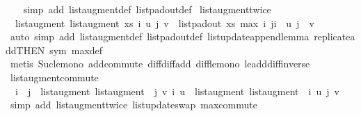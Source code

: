 \begin{isabellebody}
%
\isadelimproof
\ \ %
\endisadelimproof
%
\isatagproof
{}\isamarkupfalse%
\ {\isacharparenleft}simp\ add{\isacharcolon}\ list{\isacharunderscore}augment{\isacharunderscore}def\ list{\isacharunderscore}pad{\isacharunderscore}out{\isacharunderscore}def{\isacharparenright}%
\endisatagproof
{\isafoldproof}%
%
\isadelimproof
\isanewline
%
\endisadelimproof
\isanewline
{}\isamarkupfalse%
\ list{\isacharunderscore}augment{\isacharunderscore}twice{\isacharcolon}\isanewline
\ \ {\isachardoublequoteopen}list{\isacharunderscore}augment\ {\isacharparenleft}list{\isacharunderscore}augment\ xs\ i\ u{\isacharparenright}\ j\ v\ {\isacharequal}\ list{\isacharunderscore}pad{\isacharunderscore}out\ xs\ {\isacharparenleft}max\ i\ j{\isacharparenright}{\isacharbrackleft}i\ {\isacharcolon}{\isacharequal}\ u{\isacharcomma}\ j\ {\isacharcolon}{\isacharequal}\ v{\isacharbrackright}{\isachardoublequoteclose}\isanewline
%
\isadelimproof
\ \ %
\endisadelimproof
%
\isatagproof
{}\isamarkupfalse%
\ {\isacharparenleft}auto\ simp\ add{\isacharcolon}\ list{\isacharunderscore}augment{\isacharunderscore}def\ list{\isacharunderscore}pad{\isacharunderscore}out{\isacharunderscore}def\ list{\isacharunderscore}update{\isacharunderscore}append{\isacharunderscore}lemma{}\ replicate{\isacharunderscore}add{\isacharbrackleft}THEN\ sym{\isacharbrackright}\ max{\isacharunderscore}def{\isacharparenright}\isanewline
\ \ \isamarkupfalse%
\ {\isacharparenleft}metis\ Suc{\isacharunderscore}le{\isacharunderscore}mono\ add{\isachardot}commute\ diff{\isacharunderscore}diff{\isacharunderscore}add\ diff{\isacharunderscore}le{\isacharunderscore}mono\ le{\isacharunderscore}add{\isacharunderscore}diff{\isacharunderscore}inverse{}{\isacharparenright}\isanewline
{}\isamarkupfalse%
%
\endisatagproof
{\isafoldproof}%
%
\isadelimproof
\isanewline
%
\endisadelimproof
\isanewline
{}\isamarkupfalse%
\ list{\isacharunderscore}augment{\isacharunderscore}commute{\isacharcolon}\isanewline
\ \ {\isachardoublequoteopen}i\ {\isasymnoteq}\ j\ {\isasymLongrightarrow}\ list{\isacharunderscore}augment\ {\isacharparenleft}list{\isacharunderscore}augment\ {\isasymsigma}\ j\ v{\isacharparenright}\ i\ u\ {\isacharequal}\ list{\isacharunderscore}augment\ {\isacharparenleft}list{\isacharunderscore}augment\ {\isasymsigma}\ i\ u{\isacharparenright}\ j\ v{\isachardoublequoteclose}\isanewline
%
\isadelimproof
\ \ %
\endisadelimproof
%
\isatagproof
{}\isamarkupfalse%
\ {\isacharparenleft}simp\ add{\isacharcolon}\ list{\isacharunderscore}augment{\isacharunderscore}twice\ list{\isacharunderscore}update{\isacharunderscore}swap\ max{\isachardot}commute{\isacharparenright}%

\end{isabellebody}

